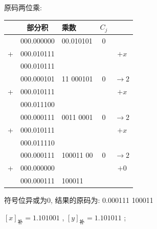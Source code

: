 \documentclass[UTF8]{report}
\newcommand{\ra}{\rightarrow}
\newcommand{\cdclass}[2]{[#1]_{\text{#2}}}
\newenvironment{solution}{{\noindent\hskip 2em \bf 解 \quad}}{}
\begin{document}
\begin{solution}
\begin{enumerate}
        原码两位乘:
        \begin{tabular}{cc|l|c|c}
             & 部分积      & 乘数      & $C_j$ & \\
            \hline
             & 000.000000 & 00.010101 & 0 & \\
            +& 000.010111 &           &   & $+x $ \\
            \hline
             & 000.010111 &           &   & \\
             & 000.000101 & 11 000101 & 0 & $\ra 2$ \\
            +& 000.010111 &           &   & $+x $ \\
            \hline
             & 000.011100 &           &   & \\
             & 000.000111 & 0011 0001 & 0 & $\ra 2$ \\
            +& 000.010111 &           &   & $+x $ \\
            \hline
             & 000.011110 &           &   & \\
             & 000.000111 & 100011 00 & 0 & $\ra 2$ \\
            +& 000.000000 &           &   & $+0 $ \\
            \hline
             & 000.000111 & 100011    &   & \\
        \end{tabular}

        符号位异或为0, 结果的原码为: 0.000111 100011
        
        $\cdclass{x}{补}=  1.101 001$ ,  $\cdclass{y}{补}= 1.101 011$ ;


\end{enumerate}
\end{solution}
\end{document}
